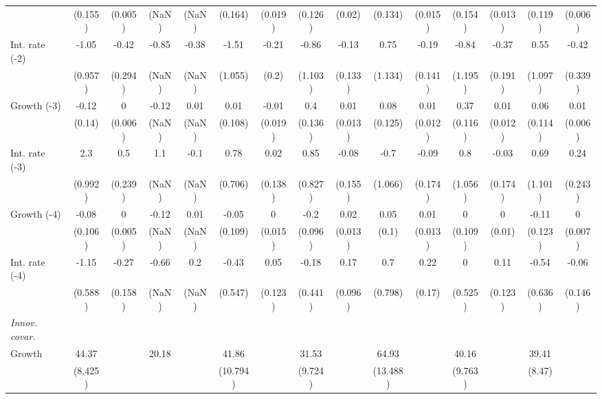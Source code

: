 \begin{table}[htbp]
\begin{tabular}{@{\extracolsep{4pt}}lcccccccccccccc@{}}
 		 & (0.155) 	 & (0.005) 	 & (NaN) 	 & (NaN) 	 & (0.164) 	 & (0.019) 	 & (0.126) 	 & (0.02) 	 & (0.134) 	 & (0.015) 	 & (0.154) 	 & (0.013) 	 & (0.119) 	 & (0.006) 	 \\ 
\quad Int. rate (-2) 	 &-1.05 	 & -0.42 	 & -0.85 	 & -0.38 	 & -1.51 	 & -0.21 	 & -0.86 	 & -0.13 	 & 0.75 	 & -0.19 	 & -0.84 	 & -0.37 	 & 0.55 	 & -0.42	 \\ 
 		 & (0.957) 	 & (0.294) 	 & (NaN) 	 & (NaN) 	 & (1.055) 	 & (0.2) 	 & (1.103) 	 & (0.133) 	 & (1.134) 	 & (0.141) 	 & (1.195) 	 & (0.191) 	 & (1.097) 	 & (0.339) 	 \\ 
\quad Growth (-3) 	 &-0.12 	 & 0 	 & -0.12 	 & 0.01 	 & 0.01 	 & -0.01 	 & 0.4 	 & 0.01 	 & 0.08 	 & 0.01 	 & 0.37 	 & 0.01 	 & 0.06 	 & 0.01	 \\ 
 		 & (0.14) 	 & (0.006) 	 & (NaN) 	 & (NaN) 	 & (0.108) 	 & (0.019) 	 & (0.136) 	 & (0.013) 	 & (0.125) 	 & (0.012) 	 & (0.116) 	 & (0.012) 	 & (0.114) 	 & (0.006) 	 \\ 
\quad Int. rate (-3) 	 &2.3 	 & 0.5 	 & 1.1 	 & -0.1 	 & 0.78 	 & 0.02 	 & 0.85 	 & -0.08 	 & -0.7 	 & -0.09 	 & 0.8 	 & -0.03 	 & 0.69 	 & 0.24	 \\ 
 		 & (0.992) 	 & (0.239) 	 & (NaN) 	 & (NaN) 	 & (0.706) 	 & (0.138) 	 & (0.827) 	 & (0.155) 	 & (1.066) 	 & (0.174) 	 & (1.056) 	 & (0.174) 	 & (1.101) 	 & (0.243) 	 \\ 
\quad Growth (-4) 	 &-0.08 	 & 0 	 & -0.12 	 & 0.01 	 & -0.05 	 & 0 	 & -0.2 	 & 0.02 	 & 0.05 	 & 0.01 	 & 0 	 & 0 	 & -0.11 	 & 0	 \\ 
 		 & (0.106) 	 & (0.005) 	 & (NaN) 	 & (NaN) 	 & (0.109) 	 & (0.015) 	 & (0.096) 	 & (0.013) 	 & (0.1) 	 & (0.013) 	 & (0.109) 	 & (0.01) 	 & (0.123) 	 & (0.007) 	 \\ 
\quad Int. rate (-4) 	 &-1.15 	 & -0.27 	 & -0.66 	 & 0.2 	 & -0.43 	 & 0.05 	 & -0.18 	 & 0.17 	 & 0.7 	 & 0.22 	 & 0 	 & 0.11 	 & -0.54 	 & -0.06	 \\ 
 		 & (0.588) 	 & (0.158) 	 & (NaN) 	 & (NaN) 	 & (0.547) 	 & (0.123) 	 & (0.441) 	 & (0.096) 	 & (0.798) 	 & (0.17) 	 & (0.525) 	 & (0.123) 	 & (0.636) 	 & (0.146) 	 \\ 
\rule{0pt}{4ex} \emph{Innov. covar.}  	 & 	 & 	 & 	 & 	 & 	 & 	 & 	 & 	 & 	 & 	 & 	 & 	 & 	 &\\ 
\quad Growth 	 &44.37 	 &  	 & 20.18 	 &  	 & 41.86 	 &  	 & 31.53 	 &  	 & 64.93 	 &  	 & 40.16 	 &  	 & 39.41 	 & 	 \\ 
 		 & (8.425) 	 &  	 &  	 &  	 & (10.794) 	 &  	 & (9.724) 	 &  	 & (13.488) 	 &  	 & (9.763) 	 &  	 & (8.47) 	 &  	 \\ 

\end{tabular}
\end{table}

